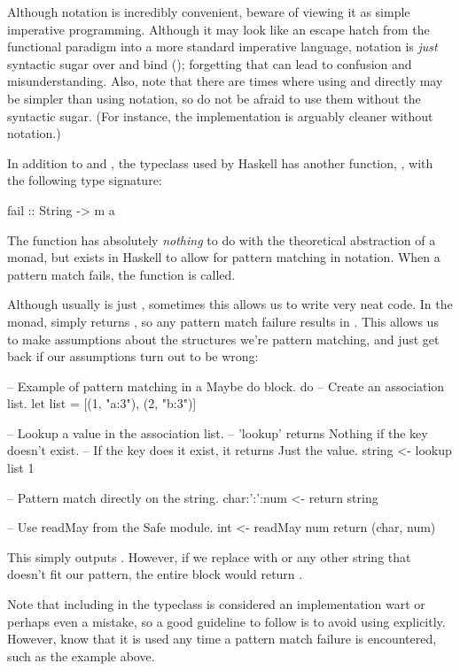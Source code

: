 Although  notation is incredibly convenient, beware of viewing it as simple imperative
programming. Although it may look like an escape hatch from the functional paradigm into a more
standard imperative language,  notation is \emph{just} syntactic sugar over
 and bind (\inline{>>=}); forgetting that can lead to confusion and misunderstanding.
Also, note that there are times where using  and \inline{>>=} directly may be simpler
than using  notation, so do not be afraid to use them without the syntactic sugar. (For
instance, the  implementation is arguably cleaner without 
notation.)

\begin{tangent}[frametitle=Signaling Failure in Monads]
In addition to \inline{>>=} and , the  typeclass used by Haskell has
another function, , with the following type signature:
\begin{haskell}
fail :: String -> m a
\end{haskell}
The  function has absolutely \emph{nothing} to do with the theoretical abstraction of a
monad, but exists in Haskell to allow for pattern matching in  notation. When a pattern
match fails, the  function is called. 

Although usually  is just , sometimes this allows us to write very neat
code. In the  monad,  simply returns , so any pattern
match failure results in . This allows us to make assumptions about the structures
we're pattern matching, and just get back  if our assumptions turn out to be wrong:
\begin{haskell}
-- Example of pattern matching in a Maybe do block.
do
  -- Create an association list.
  let list = [(1, "a:3"), (2, "b:3")]

  -- Lookup a value in the association list.
  -- 'lookup' returns Nothing if the key doesn't exist.
  -- If the key does it exist, it returns Just the value.
  string <- lookup list 1

  -- Pattern match directly on the string.
  char:':':num <- return string

  -- Use readMay from the Safe module.
  int <- readMay num
  return (char, num)
\end{haskell}
This simply outputs . However, if we replace
 with  or any other string that doesn't fit our
pattern, the entire block would return .

Note that including  in the  typeclass is considered an implementation
wart or perhaps even a mistake, so a good guideline to follow is to avoid using 
explicitly. However, know that it is used any time a pattern match failure is encountered, such as
the example above.
\end{tangent}

